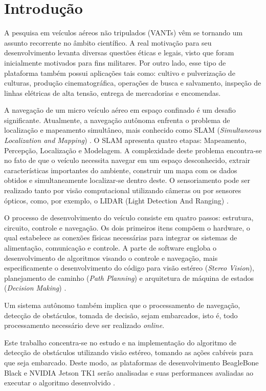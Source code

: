 \chapter{Introdução}
\label{Introducao}

A pesquisa em veículos aéreos não tripulados (VANTs) vêm se tornando um assunto recorrente no âmbito científico. A real motivação para seu desenvolvimento levanta diversas questões éticas e legais, visto que foram inicialmente motivados para fins militares. Por outro lado, esse tipo de plataforma também possui aplicações tais como: cultivo e pulverização de culturas, produção cinematográfica, operações de busca e salvamento, inspeção de linhas elétricas de alta tensão, entrega de mercadorias e encomendas.

A navegação de um micro veículo aéreo em espaço confinado é um desafio significante. Atualmente, a navegação autônoma enfrenta o problema de localização e mapeamento simultâneo, mais conhecido como SLAM (\textit{Simultaneous Localization and Mapping}) \cite{Dissanayake2001}. O SLAM apresenta quatro etapas: Mapeamento, Percepção, Localização e Modelagem. A complexidade deste problema encontra-se no fato de que o veículo necessita navegar em um espaço desconhecido, extrair características importantes do ambiente, construir um mapa com os dados obtidos e simultaneamente localizar-se dentro deste. O sensoriamento pode ser realizado tanto por visão computacional utilizando câmeras ou por sensores ópticos, como, por exemplo, o LIDAR (Light Detection And Ranging) \cite{Barry2015}. 

O processo de desenvolvimento do veículo consiste em quatro passos: estrutura, circuito, controle e navegação. Os dois primeiros itens compõem o hardware, o qual estabelece as conexões físicas necessárias para integrar os sistemas de alimentação, comunicação e controle. A parte de software engloba o desenvolvimento de algoritmos visando o controle e navegação, mais especificamente o desenvolvimento do código para visão estéreo (\textit{Stereo Vision}), planejamento de caminho (\textit{Path Planning}) e arquitetura de máquina de estados (\textit{Decision Making}) \cite{Lemaire2007}.

Um sistema autônomo também implica que o processamento de navegação, detecção de obstáculos, tomada de decisão, sejam embarcados, isto é, todo processamento necessário deve ser realizado \textit{online}. 

Este trabalho concentra-se no estudo e na implementação do algoritmo de detecção de obstáculos utilizando visão estéreo, tomando as ações cabíveis para que seja embarcado. Deste modo, as plataformas de desenvolvimento BeagleBone Black \cite{BeagleBoardOrg} e NVIDIA Jetson TK1 \cite{JetsonTK1} serão analisadas e suas performances avaliadas ao executar o algoritmo desenvolvido \cite{Shah2014}. 


